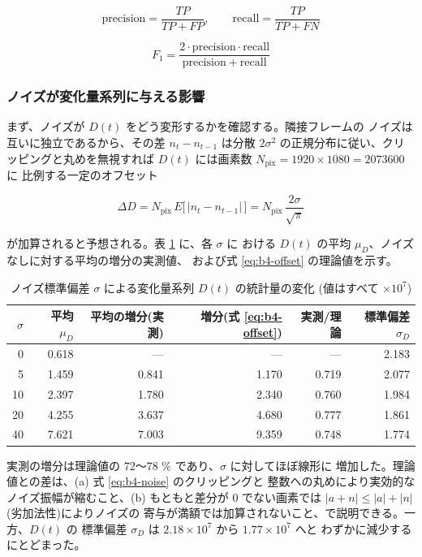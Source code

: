 \begin{equation}\label{eq:b4-pr}
\mathrm{precision} = \frac{TP}{TP + FP}, \qquad
\mathrm{recall} = \frac{TP}{TP + FN}
\end{equation}

\begin{equation}\label{eq:b4-f1}
F_1 = \frac{2 \cdot \mathrm{precision} \cdot \mathrm{recall}}
{\mathrm{precision} + \mathrm{recall}}
\end{equation}

\subsubsection{ノイズが変化量系列に与える影響}

まず、ノイズが $D(t)$ をどう変形するかを確認する。隣接フレームの
ノイズは互いに独立であるから、その差 $n_t - n_{t-1}$ は分散
$2\sigma^2$ の正規分布に従い、クリッピングと丸めを無視すれば
$D(t)$ には画素数 $N_{\mathrm{pix}} = 1920 \times 1080 = 2073600$ に
比例する一定のオフセット

\begin{equation}\label{eq:b4-offset}
\Delta D = N_{\mathrm{pix}} \, E\bigl[\,|n_t - n_{t-1}|\,\bigr]
= N_{\mathrm{pix}} \, \frac{2\sigma}{\sqrt{\pi}}
\end{equation}

が加算されると予想される。表 \ref{tab:b4-series} に、各 $\sigma$ に
おける $D(t)$ の平均 $\mu_D$、ノイズなしに対する平均の増分の実測値、
および式 \ref{eq:b4-offset} の理論値を示す。

\begin{table}[htbp]
\centering
\caption{ノイズ標準偏差 $\sigma$ による変化量系列 $D(t)$ の統計量の変化
(値はすべて $\times 10^7$)}
\label{tab:b4-series}
\begin{tabular}{rrrrrr}
\hline
$\sigma$ & 平均 $\mu_D$ & 平均の増分(実測) & 増分(式 \ref{eq:b4-offset}) &
実測/理論 & 標準偏差 $\sigma_D$ \\
\hline
0 & 0.618 & --- & --- & --- & 2.183 \\
5 & 1.459 & 0.841 & 1.170 & 0.719 & 2.077 \\
10 & 2.397 & 1.780 & 2.340 & 0.760 & 1.984 \\
20 & 4.255 & 3.637 & 4.680 & 0.777 & 1.861 \\
40 & 7.621 & 7.003 & 9.359 & 0.748 & 1.774 \\
\hline
\end{tabular}
\end{table}

実測の増分は理論値の 72〜78 \% であり、$\sigma$ に対してほぼ線形に
増加した。理論値との差は、(a) 式 \ref{eq:b4-noise} のクリッピングと
整数への丸めにより実効的なノイズ振幅が縮むこと、(b) もともと差分が
0 でない画素では $|a + n| \le |a| + |n|$(劣加法性)によりノイズの
寄与が満額では加算されないこと、で説明できる。一方、$D(t)$ の
標準偏差 $\sigma_D$ は $2.18 \times 10^7$ から $1.77 \times 10^7$ へと
わずかに減少するにとどまった。

